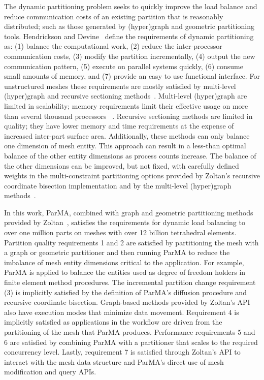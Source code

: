 The dynamic partitioning problem seeks to quickly improve the load balance and
reduce communication costs of an existing partition that is reasonably
distributed; such as those generated by (hyper)graph and geometric
partitioning tools.
Hendrickson and Devine~\cite{hendrickson2000dynamic}
define the requirements of dynamic partitioning as: (1) balance the
computational work, (2) reduce the inter-processor communication costs, (3)
modify the partition incrementally, (4) output the new communication pattern,
(5) execute on parallel systems quickly, (6) consume small amounts of memory,
and (7) provide an easy to use functional interface.
For unstructured meshes these requirements are mostly satisfied by multi-level
(hyper)graph and recursive sectioning methods~\cite{graphPtnSourcebookParComp}.
Multi-level (hyper)graph are limited in scalability; memory requirements
limit their effective usage on more than several thousand processors
~\cite{harlacherMortonSFCvsParmetis2012}.
Recursive sectioning methods are limited in quality; they have lower memory and
time requirements at the expense of increased inter-part surface area.
Additionally, these methods can only balance one dimension of mesh entity.
This approach can result in a less-than optimal balance of the other entity
dimensions as process counts increase.
The balance of the other dimensions can be improved, but not fixed, with carefully
defined weights in the multi-constraint partitioning options provided by
Zoltan's recursive coordinate bisection implementation and by the multi-level
(hyper)graph
methods~\cite{aykanat2008multi,karypis1998multilevel,schloegel2002parallel}.

In this work, ParMA, combined with graph and geometric partitioning methods
provided by Zoltan~\cite{devine2002zoltan}, satisfies the
requirements for dynamic load balancing to over one million parts on meshes
with over 12 billion tetrahedral elements.
Partition quality requirements 1 and 2 are satisfied by partitioning the
mesh with a graph or geometric partitioner and then running ParMA to
reduce the imbalance of mesh entity dimensions critical to the application.
For example, ParMA is applied to balance the entities used as degree of
freedom holders in finite element method procedures.
The incremental partition change requirement (3) is implicitly satisfied by the
definition of ParMA's diffusion procedure and recursive coordinate bisection.
Graph-based methods provided by Zoltan's API also have execution modes that
minimize data movement.
Requirement 4 is implicitly satisfied as applications in the workflow are
driven from the partitioning of the mesh that ParMA produces.
Performance requirements 5 and 6 are satisfied by combining ParMA with a
partitioner that scales to the required concurrency level.
Lastly, requirement 7 is satisfied through Zoltan's API to interact with
the mesh data structure and ParMA's direct use of mesh modification and query
APIs.
